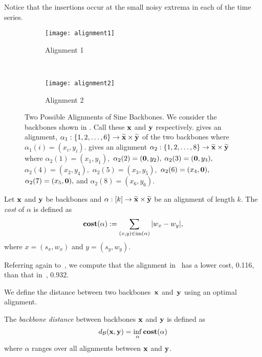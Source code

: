  Notice that the insertions occur at the small noisy extrema in
each of the time series.

\begin{figure}[htp]
    \centering
    \begin{subfigure}[b]{\textwidth}
        \centering
        \texttt{[image: alignment1]}
        \caption{Alignment 1}
        \label{fig:alignment1}
    \end{subfigure} \\
    \begin{subfigure}[b]{\textwidth}
        \centering
        \texttt{[image: alignment2]}
        \caption{Alignment 2}
        \label{fig:alignment2}
    \end{subfigure}
    \caption{Two Possible Alignments of Sine Backbones. We consider the
        backbones shown in . Call these $\textbf{x}$ and $\textbf{y}$
        respectively.  gives an alignment, $\alpha_1: \{1, 2,
        \dots, 6\} \rightarrow \widetilde{\textbf{x}} \times \widetilde{\textbf{y}}$ of the two
        backbones where $\alpha_1(i) = (x_i, y_i)$.  gives an
        alignment $\alpha_2: \{1, 2, \dots, 8\}\rightarrow \widetilde{\textbf{x}} \times
        \widetilde{\textbf{y}}$ where $\alpha_2(1) = (x_1, y_1),$ $\alpha_2(2) = ({\mathbf{0}}, y_2),$
        $\alpha_2(3) = ({\mathbf{0}}, y_3),$ $\alpha_2(4) = (x_2, y_4),$
        $\alpha_2(5)=(x_3, y_5),$  $\alpha_2(6) = (x_4, {\mathbf{0}}),$ $\alpha_2(7) =
        (x_5, {\mathbf{0}}),$ and $\alpha_2(8) = (x_6, y_6)$.} \label{fig:alignments}
\end{figure}

\begin{defn}\label{def:cost}
    Let $\textbf{x}$ and $\textbf{y}$ be backbones and $\alpha:[k] \rightarrow \widetilde{\textbf{x}} \times \widetilde{\textbf{y}}$ be an
    alignment of length $k$. The \textit{cost} of $\alpha$ is defined as
    $$
        \textbf{cost}(\alpha) := \sum_{(x,y) \in \operatorname{im}(\alpha)}
        |w_x-w_y|,
    $$
    where $x=(s_x,w_x)$ and $y=(s_y,w_y)$.
  \end{defn}

Referring again to~, we compute that the alignment
in~ has a lower cost, 0.116, than that
in~, 0.932.

We define the distance between two backbones~$\textbf{x}$ and~$\textbf{y}$ using an
optimal alignment. 

\begin{defn}\label{def:backbone-dist}
    The \emph{backbone distance} between backbones $\textbf{x}$ and $\textbf{y}$ is defined
    as
    \begin{equation}%
    d_{\B}(\x, \y) = \inf_{\alpha}\cost(\alpha)
    \end{equation}
    where $\alpha$ ranges over all alignments between $\textbf{x}$ and $\textbf{y}$.
\end{defn}

